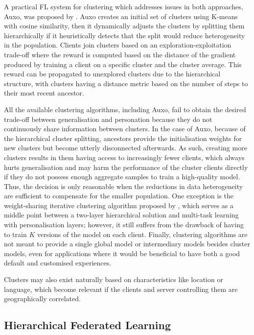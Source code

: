 A practical FL system for clustering which addresses issues in both approaches, Auxo, was proposed by \citet{Auxo}. Auxo creates an initial set of clusters using K-means with cosine similarity, then it dynamically adjusts the clusters by splitting them hierarchically if it heuristically detects that the split would reduce heterogeneity in the population. Clients join clusters based on an exploration-exploitation trade-off where the reward is computed based on the distance of the gradient produced by training a client on a specific cluster and the cluster average. This reward can be propagated to unexplored clusters due to the hierarchical structure, with clusters having a distance metric based on the number of steps to their most recent ancestor.

All the available clustering algorithms, including Auxo,  fail to obtain the desired trade-off between generalisation and personation because they do not continuously share information between clusters. In the case of Auxo, because of the hierarchical cluster splitting, ancestors provide the initialisation weights for new clusters but become utterly disconnected afterwards. As such, creating more clusters results in them having access to increasingly fewer clients, which always hurts generalisation and may harm the performance of the cluster clients directly if they do not possess enough aggregate samples to train a high-quality model. Thus, the decision is only reasonable when the reductions in data heterogeneity are sufficient to compensate for the smaller population. One exception is the weight-sharing iterative clustering algorithm proposed by \citet{AnEfficientFrameworkForClusteredFL}, which serves as a middle point between a two-layer hierarchical solution and multi-task learning with personalisation layers; however, it still suffers from the drawback of having to train $K$ versions of the model on each client. Finally, clustering algorithms are not meant to provide a single global model or intermediary models besides cluster models, even for applications where it would be beneficial to have both a good default and customised experiences.

Clusters may also exist naturally based on characteristics like location or language, which become relevant if the clients and server controlling them are geographically correlated.


\subsection{Hierarchical Federated Learning}\label{sec:back:HFL}


